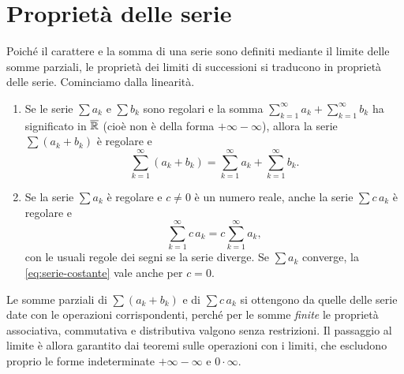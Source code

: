 \section{Proprietà delle serie}
\label{sec:proprieta-serie}

Poiché il carattere e la somma di una serie sono definiti mediante il limite delle somme
parziali, le proprietà dei limiti di successioni si traducono in proprietà delle serie.
Cominciamo dalla linearità.

\begin{proposizione}[Linearità]\label{prop:linearita-serie}
\begin{enumerate}[label=\textup{(\roman*)}]
  \item Se le serie $\sum a_{k}$ e $\sum b_{k}$ sono regolari e la somma
  $\sum_{k=1}^{\infty}a_{k}+\sum_{k=1}^{\infty}b_{k}$ ha significato in $\overline{\mathbb{R}}$ (cioè non è della forma
  $+\infty-\infty$), allora la serie $\sum(a_{k}+b_{k})$ è regolare e
  \begin{equation}\label{eq:serie-somma}
    \sum_{k=1}^{\infty}(a_{k}+b_{k})=\sum_{k=1}^{\infty}a_{k}+\sum_{k=1}^{\infty}b_{k} .
  \end{equation}
  \item Se la serie $\sum a_{k}$ è regolare e $c\neq0$ è un numero reale, anche la serie
  $\sum c\,a_{k}$ è regolare e
  \begin{equation}\label{eq:serie-costante}
    \sum_{k=1}^{\infty}c\,a_{k}=c\sum_{k=1}^{\infty}a_{k} ,
  \end{equation}
  con le usuali regole dei segni se la serie diverge. Se $\sum a_{k}$ converge, la
  \eqref{eq:serie-costante} vale anche per $c=0$.
\end{enumerate}
\end{proposizione}

\begin{schema}
\end{schema}

\begin{strategia}
Le somme parziali di $\sum(a_{k}+b_{k})$ e di $\sum c\,a_{k}$ si ottengono da quelle delle serie date
con le operazioni corrispondenti, perché per le somme \emph{finite} le proprietà
associativa, commutativa e distributiva valgono senza restrizioni. Il passaggio al limite
è allora garantito dai teoremi sulle operazioni con i limiti, che escludono proprio le
forme indeterminate $+\infty-\infty$ e $0\cdot\infty$.
\end{strategia}

